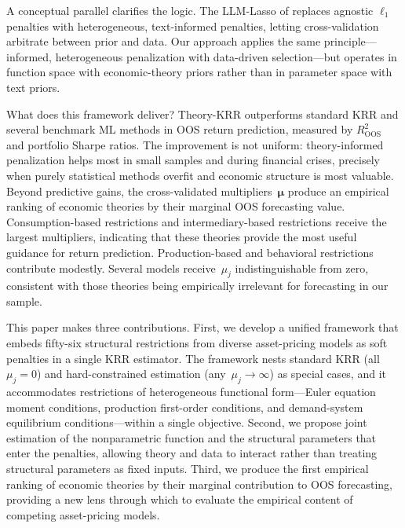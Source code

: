A conceptual parallel clarifies the logic. The LLM-Lasso of \citet{bybee2025llmlasso} replaces agnostic $\ell_1$ penalties with heterogeneous, text-informed penalties, letting cross-validation arbitrate between prior and data. Our approach applies the same principle---informed, heterogeneous penalization with data-driven selection---but operates in function space with economic-theory priors rather than in parameter space with text priors.

What does this framework deliver? Theory-KRR outperforms standard KRR and several benchmark ML methods in OOS return prediction, measured by $R^2_{\text{OOS}}$ and portfolio Sharpe ratios. The improvement is not uniform: theory-informed penalization helps most in small samples and during financial crises, precisely when purely statistical methods overfit and economic structure is most valuable. Beyond predictive gains, the cross-validated multipliers~$\bm{\mu}$ produce an empirical ranking of economic theories by their marginal OOS forecasting value. Consumption-based restrictions \citep{campbellcochrane1999,bansalyaron2004} and intermediary-based restrictions \citep{hekrishnamurthy2013,adrianetulamuir2014} receive the largest multipliers, indicating that these theories provide the most useful guidance for return prediction. Production-based and behavioral restrictions contribute modestly. Several models receive~$\mu_j$ indistinguishable from zero, consistent with those theories being empirically irrelevant for forecasting in our sample.

This paper makes three contributions. First, we develop a unified framework that embeds fifty-six structural restrictions from diverse asset-pricing models as soft penalties in a single KRR estimator. The framework nests standard KRR (all~$\mu_j = 0$) and hard-constrained estimation (any~$\mu_j \to \infty$) as special cases, and it accommodates restrictions of heterogeneous functional form---Euler equation moment conditions, production first-order conditions, and demand-system equilibrium conditions---within a single objective. Second, we propose joint estimation of the nonparametric function and the structural parameters that enter the penalties, allowing theory and data to interact rather than treating structural parameters as fixed inputs. Third, we produce the first empirical ranking of economic theories by their marginal contribution to OOS forecasting, providing a new lens through which to evaluate the empirical content of competing asset-pricing models.

